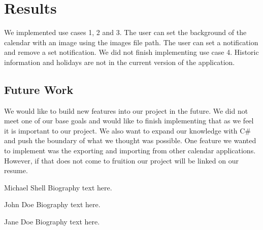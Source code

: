 \documentclass[10pt,conference,onecolumn,compsoc]{IEEEtran}
\begin{document}
\section{Results}
We implemented use cases 1, 2 and 3. The user can set the background of the calendar with an image using the images file path. The user can set a notification and remove a set notification. We did not finish implementing use case 4. Historic information and holidays are not in the current version of the application.


\subsection{Future Work}
We would like to build new features into our project in the future. We did not meet one of our base goals and would like to finish implementing that as we feel it is important to our project. We also want to expand our knowledge with C\# and push the boundary of what we thought was possible. One feature we wanted to implement was the exporting and importing from other calendar applications. However, if that does not come to fruition our project will be linked on our resume.







\begin{IEEEbiography}{Michael Shell}
Biography text here.
\end{IEEEbiography}

\begin{IEEEbiographynophoto}{John Doe}
Biography text here.
\end{IEEEbiographynophoto}


\begin{IEEEbiographynophoto}{Jane Doe}
Biography text here.
\end{IEEEbiographynophoto}





\end{document}
